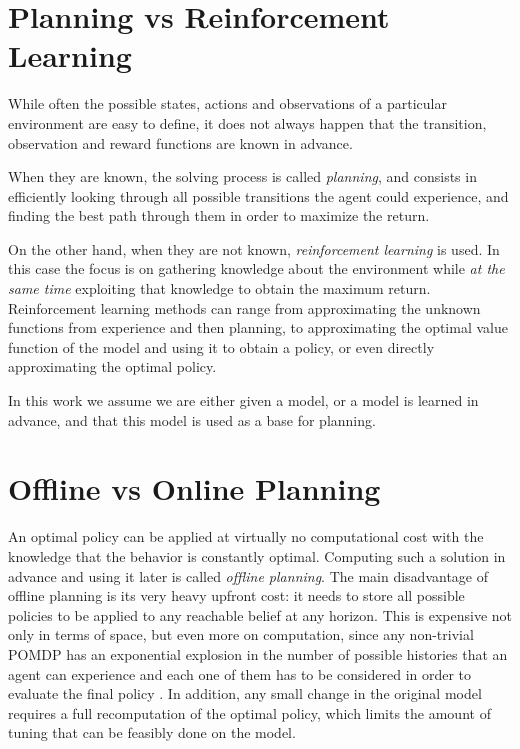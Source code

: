\section{Planning vs Reinforcement Learning}\label{ref:solutions}

While often the possible states, actions and observations of a particular environment are easy to
define, it does not always happen that the transition, observation and reward functions are known in
advance.

When they are known, the solving process is called \textit{planning}, and consists in efficiently
looking through all possible transitions the agent could experience, and finding the best path
through them in order to maximize the return.

On the other hand, when they are not known, \textit{reinforcement learning} is used. In this case the
focus is on gathering knowledge about the environment while \textit{at the same time} exploiting that
knowledge to obtain the maximum return. Reinforcement learning methods can range from approximating
the unknown functions from experience and then planning, to approximating the optimal value function
of the model and using it to obtain a policy, or even directly approximating the optimal policy.

In this work we assume we are either given a model, or a model is learned in advance, and that this
model is used as a base for planning.


\section{Offline vs Online Planning}

An optimal policy can be applied at virtually no computational cost with the knowledge that the
behavior is constantly optimal. Computing such a solution in advance and using it later is called
\textit{offline planning}. The main disadvantage of offline planning is its very heavy upfront cost:
it needs to store all possible policies to be applied to any reachable belief at any horizon. This
is expensive not only in terms of space, but even more on computation, since any non-trivial POMDP
has an exponential explosion in the number of possible histories that an agent can experience and
each one of them has to be considered in order to evaluate the final policy \cite{cit:pomdp}. In
addition, any small change in the original model requires a full recomputation of the optimal
policy, which limits the amount of tuning that can be feasibly done on the model.

